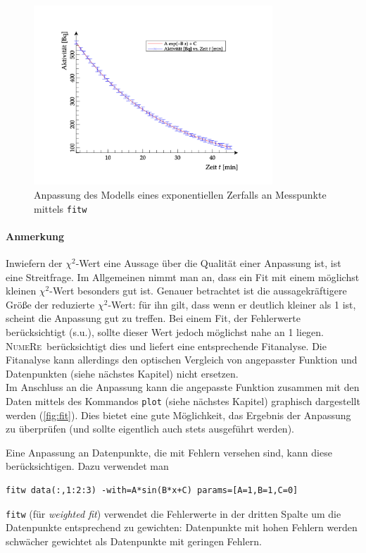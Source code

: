 \documentclass[DIV=14,headsepline,footsepline]{scrbook}
\newcommand{\NR}{\textsc{Nu\-me\-Re}}
\begin{document}
				\begin{figure}[htb]%
					\centering
					\includegraphics[width=0.8\textwidth]{_graphics/plot.png}
					\caption{Anpassung des Modells eines exponentiellen Zerfalls an Messpunkte mittels \lstinline{fitw}}
					\label{fig:fit}
				\end{figure}
				
				\paragraph{Anmerkung}
					Inwiefern der $\chi^2$-Wert eine Aussage über die Qualität einer Anpassung ist, ist eine Streitfrage. Im Allgemeinen nimmt man an, dass ein Fit mit einem möglichst kleinen $\chi^2$-Wert besonders gut ist. Genauer betrachtet ist die aussagekräftigere Größe der reduzierte $\chi^2$-Wert: für ihn gilt, dass wenn er deutlich kleiner als 1 ist, scheint die Anpassung gut zu treffen. Bei einem Fit, der Fehlerwerte berücksichtigt (s.u.), sollte dieser Wert jedoch möglichst nahe an 1 liegen. \NR\ berücksichtigt dies und liefert eine entsprechende Fitanalyse. Die Fitanalyse kann allerdings den optischen Vergleich von angepasster Funktion und Datenpunkten (siehe nächstes Kapitel) nicht ersetzen.\bigskip\\
				Im Anschluss an die Anpassung kann die angepasste Funktion zusammen mit den Daten mittels des Kommandos \lstinline+plot+ (siehe nächstes Kapitel) graphisch dargestellt werden (\autoref{fig:fit}). Dies bietet eine gute Möglichkeit, das Ergebnis der Anpassung zu überprüfen (und sollte eigentlich auch stets ausgeführt werden).
				
				Eine Anpassung an Datenpunkte, die mit Fehlern versehen sind, kann diese berücksichtigen. Dazu verwendet man
				\begin{lstlisting}
fitw data(:,1:2:3) -with=A*sin(B*x+C) params=[A=1,B=1,C=0]
				\end{lstlisting}
				\lstinline+fitw+ (für \emph{weighted fit}) verwendet die Fehlerwerte in der dritten Spalte um die Datenpunkte entsprechend zu gewichten: Datenpunkte mit hohen Fehlern werden schwächer gewichtet als Datenpunkte mit geringen Fehlern.
				
\end{document}
